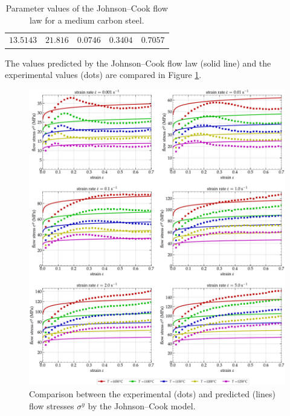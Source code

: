 \documentclass[metals,article,accept,pdftex,moreauthors]{Definitions/mdpi}
\begin{document}
\begin{table}[H]

\caption{Parameter values of the Johnson--Cook flow law for a medium carbon steel.}
\begin{tabularx}{\textwidth}{CCCCC}
\toprule
{} &  &  &  &  \\
\midrule
$13.5143$ & $21.816$ & $0.0746$ & $0.3404$ & $0.7057$ \\
\bottomrule
\end{tabularx}
\label{tab:JC}
\end{table}

The values predicted by the Johnson--Cook flow law (solid line) and the experimental values (dots) are compared in Figure \ref{fig:CompExp-JC-6}.
\begin{figure}[H]

\includegraphics[width=0.99\columnwidth]{Figures/CompExp-JC-6}
\caption{{Comparison} %
 between the experimental (dots) and predicted (lines) flow stresses $\sigma^y$ by the Johnson--Cook model.}
\label{fig:CompExp-JC-6}
\end{figure}
\end{document}
